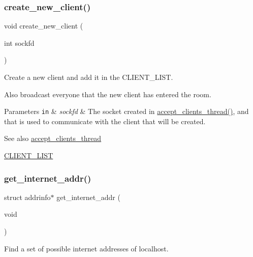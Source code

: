 \subsubsection{\texorpdfstring{create\+\_\+new\+\_\+client()}{create\_new\_client()}}
{\footnotesize\ttfamily void create\+\_\+new\+\_\+client (\begin{DoxyParamCaption}\item[{int}]{sockfd }\end{DoxyParamCaption})}



Create a new client and add it in the {\ttfamily C\+L\+I\+E\+N\+T\+\_\+\+L\+I\+ST}. 

Also broadcast everyone that the new client has entered the room.


\begin{DoxyParams}[1]{Parameters}
\mbox{\tt in}  & {\em sockfd} & The socket created in \hyperlink{zip-zop-server_8c_aecda02796082ba70b0c51545862d03a6}{accept\+\_\+clients\+\_\+thread()}, and that is used to communicate with the client that will be created.\\
\hline
\end{DoxyParams}
\begin{DoxySeeAlso}{See also}
\hyperlink{zip-zop-server_8c_aecda02796082ba70b0c51545862d03a6}{accept\+\_\+clients\+\_\+thread} 

\hyperlink{zip-zop-server_8c_a32076dcdfaf1057a014d74d01cc7e08e}{C\+L\+I\+E\+N\+T\+\_\+\+L\+I\+ST} 
\end{DoxySeeAlso}
\mbox{\label{zip-zop-server_8c_a2d9748875d07382b9dbecb97c6cd9b62}} 
\subsubsection{\texorpdfstring{get\+\_\+internet\+\_\+addr()}{get\_internet\_addr()}}
{\footnotesize\ttfamily struct addrinfo$\ast$ get\+\_\+internet\+\_\+addr (\begin{DoxyParamCaption}\item[{void}]{ }\end{DoxyParamCaption})}



Find a set of possible internet addresses of localhost. 


